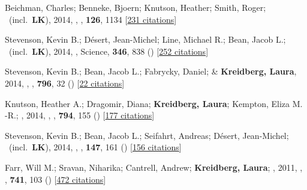\item[{\color{numcolor}\scriptsize6}] Beichman, Charles; Benneke, Bjoern; Knutson, Heather; Smith, Roger; \etal\ (incl.\ \textbf{LK}), 2014, , \pasp, \textbf{126}, 1134 [\href{https://ui.adsabs.harvard.edu/abs/2014PASP..126.1134B}{231 citations}]

\item[{\color{numcolor}\scriptsize5}] Stevenson, Kevin B.; D{\'e}sert, Jean-Michel; Line, Michael R.; Bean, Jacob L.; \etal\ (incl.\ \textbf{LK}), 2014, , Science, \textbf{346}, 838 () [\href{https://ui.adsabs.harvard.edu/abs/2014Sci...346..838S}{252 citations}]

\item[{\color{numcolor}\scriptsize4}] Stevenson, Kevin B.; Bean, Jacob L.; Fabrycky, Daniel; \& \textbf{Kreidberg, Laura}, 2014, , \apj, \textbf{796}, 32 () [\href{https://ui.adsabs.harvard.edu/abs/2014ApJ...796...32S}{22 citations}]

\item[{\color{numcolor}\scriptsize3}] Knutson, Heather A.; Dragomir, Diana; \textbf{Kreidberg, Laura}; Kempton, Eliza M. -R.; \etal, 2014, , \apj, \textbf{794}, 155 () [\href{https://ui.adsabs.harvard.edu/abs/2014ApJ...794..155K}{177 citations}]

\item[{\color{numcolor}\scriptsize2}] Stevenson, Kevin B.; Bean, Jacob L.; Seifahrt, Andreas; D{\'e}sert, Jean-Michel; \etal\ (incl.\ \textbf{LK}), 2014, , \aj, \textbf{147}, 161 () [\href{https://ui.adsabs.harvard.edu/abs/2014AJ....147..161S}{156 citations}]

\item[{\color{numcolor}\scriptsize1}] Farr, Will M.; Sravan, Niharika; Cantrell, Andrew; \textbf{Kreidberg, Laura}; \etal, 2011, , \apj, \textbf{741}, 103 () [\href{https://ui.adsabs.harvard.edu/abs/2011ApJ...741..103F}{472 citations}]